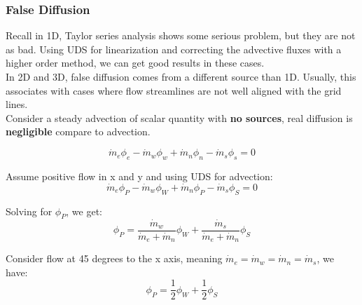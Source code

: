 \documentclass[11pt]{article}
\begin{document}
\subsubsection{False Diffusion}
\label{sec:orge0f57b3}
Recall in 1D, Taylor series analysis shows some serious problem, but they are not as bad. Using
UDS for linearization and correcting the advective fluxes with a higher order method, we can get
good results in these cases.\\

In 2D and 3D, false diffusion comes from a different source than 1D. Usually, this associates with
cases where flow streamlines are not well aligned with the grid lines. \\

Consider a steady advection of scalar quantity with \textbf{no sources}, real diffusion is \textbf{negligible} compare
to advection.

\begin{equation*}
\dot{m}_e \phi_e - \dot{m}_w \phi_w + \dot{m}_n \phi_n - \dot{m}_s \phi_s = 0
\end{equation*}    

Assume positive flow in x and y and using UDS for advection:
\begin{equation*}
\dot{m}_e \phi_P - \dot{m}_w\phi_W + \dot{m}_n \phi_P - \dot{m}_s \phi_S = 0
\end{equation*}

Solving for \(\phi_P\), we get:
\begin{equation*}
\phi_P = \frac{\dot{m}_w}{\dot{m}_e+\dot{m}_n}\phi_W +  \frac{\dot{m}_s}{\dot{m}_e+\dot{m}_n}\phi_S
\end{equation*}

Consider flow at 45 degrees to the x axis, meaning \(\dot{m}_e = \dot{m}_w = \dot{m}_n = \dot{m}_s\),
we have:
\begin{equation*}
\phi_P = \frac{1}{2}\phi_W + \frac{1}{2}\phi_S
\end{equation*}
\end{document}

